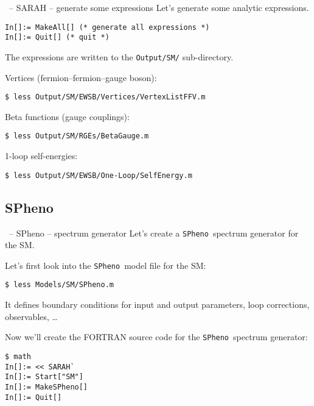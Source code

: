 \documentclass[11pt]{beamer}
\newcommand{\SPheno}{\texttt{SPheno}}
\begin{document}

\begin{frame}[fragile]{\insertsection\ -- SARAH -- generate some expressions}
  Let's  generate some analytic expressions.
  \begin{lstlisting}
In[]:= MakeAll[] (* generate all expressions *)
In[]:= Quit[] (* quit *)\end{lstlisting}
  The expressions are written to the \texttt{Output/SM/} sub-directory.

  \medskip

  Vertices (fermion--fermion--gauge boson):
  \begin{lstlisting}
$ less Output/SM/EWSB/Vertices/VertexListFFV.m\end{lstlisting}%
  Beta functions (gauge couplings):
  \begin{lstlisting}
$ less Output/SM/RGEs/BetaGauge.m\end{lstlisting}%
  1-loop self-energies:
  \begin{lstlisting}
$ less Output/SM/EWSB/One-Loop/SelfEnergy.m\end{lstlisting}%
\end{frame}


\subsection{SPheno}


\begin{frame}[fragile]{\insertsection\ -- SPheno -- spectrum generator}
  Let's create a \SPheno\ spectrum generator for the SM.

  \bigskip

  Let's first look into the \SPheno\ model file for the SM:
  \begin{lstlisting}
$ less Models/SM/SPheno.m\end{lstlisting}%
  It defines boundary conditions for input and output parameters, loop
  corrections, observables, \ldots

  \bigskip

  Now we'll create the FORTRAN source code for the \SPheno\ spectrum
  generator:
  \begin{lstlisting}
$ math
In[]:= << SARAH`
In[]:= Start["SM"]
In[]:= MakeSPheno[]
In[]:= Quit[]\end{lstlisting}%

\end{frame}
\end{document}
